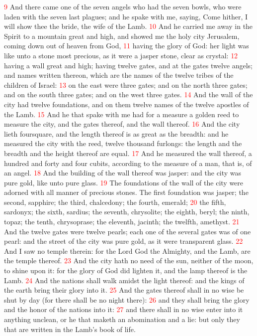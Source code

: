 \documentclass[12pt,twoside]{memoir}
\newcommand{\vnum}[1]{\textcolor{red}{\normalsize{#1}}}
\begin{document}
\vnum{9} And there came one of the seven angels who had the seven bowls, who were laden with the seven last plagues; and he spake with me, saying, Come hither, I will show thee the bride, the wife of the Lamb. 
\vnum{10} And he carried me away in the Spirit to a mountain great and high, and showed me the holy city Jerusalem, coming down out of heaven from God, 
\vnum{11} having the glory of God: her light was like unto a stone most precious, as it were a jasper stone, clear as crystal: 
\vnum{12} having a wall great and high; having twelve gates, and at the gates twelve angels; and names written thereon, which are the names of the twelve tribes of the children of Israel: 
\vnum{13} on the east were three gates; and on the north three gates; and on the south three gates; and on the west three gates. 
\vnum{14} And the wall of the city had twelve foundations, and on them twelve names of the twelve apostles of the Lamb. 
\vnum{15} And he that spake with me had for a measure a golden reed to measure the city, and the gates thereof, and the wall thereof. 
\vnum{16} And the city lieth foursquare, and the length thereof is as great as the breadth: and he measured the city with the reed, twelve thousand furlongs: the length and the breadth and the height thereof are equal. 
\vnum{17} And he measured the wall thereof, a hundred and forty and four cubits, according to the measure of a man, that is, of an angel. 
\vnum{18} And the building of the wall thereof was jasper: and the city was pure gold, like unto pure glass. 
\vnum{19} The foundations of the wall of the city were adorned with all manner of precious stones. The first foundation was jasper; the second, sapphire; the third, chalcedony; the fourth, emerald; 
\vnum{20} the fifth, sardonyx; the sixth, sardius; the seventh, chrysolite; the eighth, beryl; the ninth, topaz; the tenth, chrysoprase; the eleventh, jacinth; the twelfth, amethyst. 
\vnum{21} And the twelve gates were twelve pearls; each one of the several gates was of one pearl: and the street of the city was pure gold, as it were transparent glass. 
\vnum{22} And I saw no temple therein: for the Lord God the Almighty, and the Lamb, are the temple thereof. 
\vnum{23} And the city hath no need of the sun, neither of the moon, to shine upon it: for the glory of God did lighten it, and the lamp thereof is the Lamb. 
\vnum{24} And the nations shall walk amidst the light thereof: and the kings of the earth bring their glory into it. 
\vnum{25} And the gates thereof shall in no wise be shut by day (for there shall be no night there): 
\vnum{26} and they shall bring the glory and the honor of the nations into it: 
\vnum{27} and there shall in no wise enter into it anything unclean, or he that maketh an abomination and a lie: but only they that are written in the Lamb’s book of life. 
\end{document}
